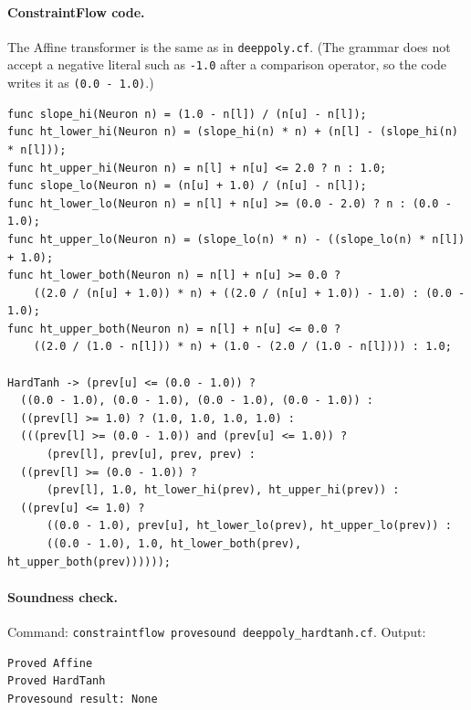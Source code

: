 \paragraph{ConstraintFlow code.}
The Affine transformer is the same as in \texttt{deeppoly.cf}.
(The grammar does not accept a negative literal such as \texttt{-1.0}
after a comparison operator, so the code writes it as
\texttt{(0.0 - 1.0)}.)
\begin{verbatim}
func slope_hi(Neuron n) = (1.0 - n[l]) / (n[u] - n[l]);
func ht_lower_hi(Neuron n) = (slope_hi(n) * n) + (n[l] - (slope_hi(n) * n[l]));
func ht_upper_hi(Neuron n) = n[l] + n[u] <= 2.0 ? n : 1.0;
func slope_lo(Neuron n) = (n[u] + 1.0) / (n[u] - n[l]);
func ht_lower_lo(Neuron n) = n[l] + n[u] >= (0.0 - 2.0) ? n : (0.0 - 1.0);
func ht_upper_lo(Neuron n) = (slope_lo(n) * n) - ((slope_lo(n) * n[l]) + 1.0);
func ht_lower_both(Neuron n) = n[l] + n[u] >= 0.0 ?
    ((2.0 / (n[u] + 1.0)) * n) + ((2.0 / (n[u] + 1.0)) - 1.0) : (0.0 - 1.0);
func ht_upper_both(Neuron n) = n[l] + n[u] <= 0.0 ?
    ((2.0 / (1.0 - n[l])) * n) + (1.0 - (2.0 / (1.0 - n[l]))) : 1.0;

HardTanh -> (prev[u] <= (0.0 - 1.0)) ?
  ((0.0 - 1.0), (0.0 - 1.0), (0.0 - 1.0), (0.0 - 1.0)) :
  ((prev[l] >= 1.0) ? (1.0, 1.0, 1.0, 1.0) :
  (((prev[l] >= (0.0 - 1.0)) and (prev[u] <= 1.0)) ?
      (prev[l], prev[u], prev, prev) :
  ((prev[l] >= (0.0 - 1.0)) ?
      (prev[l], 1.0, ht_lower_hi(prev), ht_upper_hi(prev)) :
  ((prev[u] <= 1.0) ?
      ((0.0 - 1.0), prev[u], ht_lower_lo(prev), ht_upper_lo(prev)) :
      ((0.0 - 1.0), 1.0, ht_lower_both(prev), ht_upper_both(prev))))));
\end{verbatim}

\paragraph{Soundness check.}
Command: \texttt{constraintflow provesound deeppoly\_hardtanh.cf}. Output:
\begin{verbatim}
Proved Affine
Proved HardTanh
Provesound result: None
\end{verbatim}
